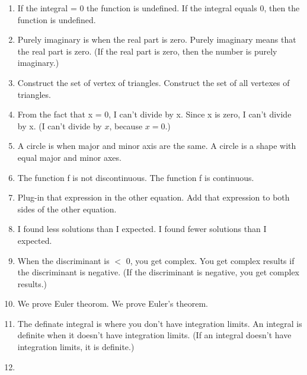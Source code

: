 \documentclass[11pt]{article}
\begin{document}
\begin{enumerate}
\item
If the integral = 0 the function is undefined. \textrightarrow \hspace*{0.25cm} If the integral equals 0, then the function is undefined.
\item
Purely imaginary is when the real part is zero. \textrightarrow \hspace*{0.25cm} Purely imaginary means that the real part is zero. (If the real part is zero, then the number is purely imaginary.)
\item
Construct the set of vertex of triangles. \textrightarrow \hspace*{0.25cm}  Construct the set of all vertexes of triangles.
\item
From the fact that x = 0, I can't divide by x. \textrightarrow \hspace*{0.25cm} Since x is zero, I can’t divide by x. (I can't divide by $x$, because $x=0$.)
\item
A circle is when major and minor axis are the same. \textrightarrow \hspace*{0.25cm} A circle is a shape with equal major and minor axes.
\item
The function f is not discontinuous. \textrightarrow \hspace*{0.25cm} The function f is continuous.
\item
Plug-in that expression in the other equation. \textrightarrow \hspace*{0.25cm} Add that expression to both sides of the other equation.
\item
I found less solutions than I expected. \textrightarrow \hspace*{0.25cm} I found fewer solutions than I expected.
\item
When the discriminant is $<$ 0, you get complex. \textrightarrow \hspace*{0.25cm} You get complex results if the discriminant is negative. (If the discriminant is negative, you get complex results.)
\item
We prove Euler theorom. \textrightarrow \hspace*{0.25cm} We prove Euler's theorem.
\item
The definate integral is where you don't have integration limits. \textrightarrow \hspace*{0.25cm} An integral is definite when it doesn't have integration limits.
(If an integral doesn't have integration limits, it is definite.)
\item

\end{enumerate}
\end{document}
